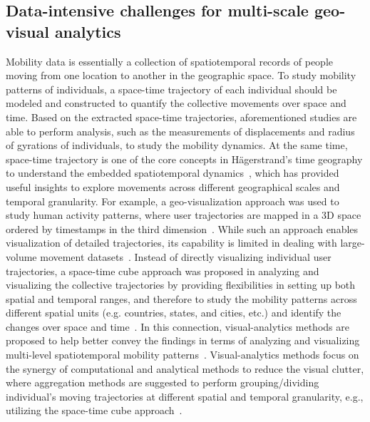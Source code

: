 \documentclass[a4paper, 11pt]{article}
\begin{document}
\subsection{Data-intensive challenges for multi-scale geo-visual analytics}
Mobility data is essentially a collection of spatiotemporal records of people moving from one location to another in the geographic space.
To study mobility patterns of individuals, a space-time trajectory of each individual should be modeled and constructed to quantify the collective movements over space and time.
Based on the extracted space-time trajectories, aforementioned studies are able to perform analysis, such as the measurements of displacements and radius of gyrations of individuals, to study the mobility dynamics.
At the same time, space-time trajectory is one of the core concepts in H{\"a}gerstrand's time geography to understand the embedded spatiotemporal dynamics~\citep{hagerstrand1985time}, which has provided useful insights to explore movements across different geographical scales and temporal granularity.
For example, a geo-visualization approach was used to study human activity patterns, where user trajectories are mapped in a 3D space ordered by timestamps in the third dimension~\citep{kwan2004geovisualization}. While such an approach enables visualization of detailed trajectories, its capability is limited in dealing with large-volume movement datasets~\citep{andrienko2007designing}.
Instead of directly visualizing individual user trajectories, a space-time cube approach was proposed in analyzing and visualizing the collective trajectories by providing flexibilities in setting up both spatial and temporal ranges, and therefore to study the mobility patterns across different spatial units (e.g. countries, states, and cities, etc.) and identify the changes over space and time~\citep{maceachren2001research, maceachren2004maps}.
In this connection, visual-analytics methods are proposed to help better convey the findings in terms of analyzing and visualizing multi-level spatiotemporal mobility patterns~\citep{andrienko2007designing,andrienko2007visual}.
Visual-analytics methods focus on the synergy of computational and analytical methods to reduce the visual clutter, where aggregation methods are suggested to perform grouping/dividing individual's moving trajectories at different spatial and temporal granularity, e.g., utilizing the space-time cube approach~\citep{andrienko2007designing}.
\end{document}
